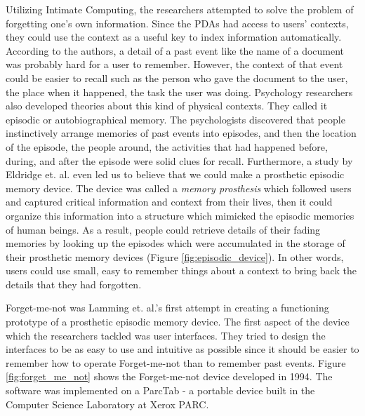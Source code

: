 Utilizing Intimate Computing, the researchers attempted to solve the problem of forgetting one's own information. Since the PDAs had access to users' contexts, they could use the context as a useful key to index information automatically. According to the authors, a detail of a past event like the name of a document was probably hard for a user to remember. However, the context of that event could be easier to recall such as the person who gave the document to the user, the place when it happened, the task the user was doing. Psychology researchers also developed theories about this kind of physical contexts. They called it episodic or autobiographical memory. The psychologists discovered that people instinctively arrange memories of past events into episodes, and then the location of the episode, the people around, the activities that had happened before, during, and after the episode were solid clues for recall. Furthermore, a study by Eldridge et. al. \cite{eldridge1994autobiographical} even led us to believe that we could make a prosthetic episodic memory device. The device was called a \textit{memory prosthesis} which followed users and captured critical information and context from their lives, then it could organize this information into a structure which mimicked the episodic memories of human beings. As a result, people could retrieve details of their fading memories by looking up the episodes which were accumulated in the storage of their prosthetic memory devices (Figure \ref{fig:episodic_device}). In other words, users could use small, easy to remember things about a context to bring back the details that they had forgotten.

Forget-me-not was Lamming et. al.'s first attempt \cite{lamming1994forget} in creating a functioning prototype of a prosthetic episodic memory device. The first aspect of the device which the researchers tackled was user interfaces. They tried to design the interfaces to be as easy to use and intuitive as possible since it should be easier to remember how to operate Forget-me-not than to remember past events. Figure \ref{fig:forget_me_not} shows the Forget-me-not device developed in 1994. The software was implemented on a ParcTab - a portable device built in the Computer Science Laboratory at Xerox PARC.

